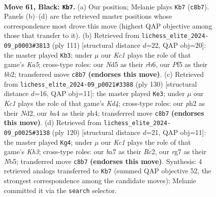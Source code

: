 \documentclass[11pt]{article}
\begin{document}
\clearpage

\begin{figure}[p]\centering
\begin{subfigure}{0.46\textwidth}\centering
\resizebox{\linewidth}{!}{%
\newchessgame
\chessboard[
  setfen={2k5/B1p3R1/8/3n1p2/B4P2/8/3K3P/8 b - - 4 61},
  showmover=false,
  pgfstyle=straightmove, color=movearrow, markmove={c8-b7}
]}
\caption{}
\end{subfigure}\hfill
\begin{subfigure}{0.46\textwidth}\centering
\resizebox{\linewidth}{!}{%
\newchessgame
\chessboard[
  setfen={4r3/8/1R4P1/8/kp6/8/1Bp5/6K1 b - - 1 56},
  showmover=false,
  pgfstyle=straightmove, color=movearrow, markmove={a4-b3}
]}
\caption{}
\end{subfigure}
\\[4pt]
\begin{subfigure}{0.46\textwidth}\centering
\resizebox{\linewidth}{!}{%
\newchessgame
\chessboard[
  setfen={5k2/1b6/8/5P2/3K3p/3p3P/3N1N1r/8 w - - 6 66},
  showmover=false,
  pgfstyle=straightmove, color=movearrow, markmove={d4-e3}
]}
\caption{}
\end{subfigure}\hfill
\begin{subfigure}{0.46\textwidth}\centering
\resizebox{\linewidth}{!}{%
\newchessgame
\chessboard[
  setfen={8/Pb1k4/1b3p1p/1N6/5p2/7K/2R2P2/8 w - - 0 61},
  showmover=false,
  pgfstyle=straightmove, color=movearrow, markmove={h3-g4}
]}
\caption{}
\end{subfigure}
\caption{\textbf{Move 61, Black: \texttt{Kb7}.} (a) Our position; Melanie plays \texttt{Kb7} (\texttt{c8b7}). Panels (b)--(d) are the retrieved master positions whose correspondence most drove this move (highest QAP objective among those that transfer to it). (b) Retrieved from \texttt{lichess\_elite\_2024-09\_p0003\#3813} (ply 111) [structural distance $d$=22, QAP obj=20]: the master played \texttt{Kb3}; under $\mu$ our \emph{Kc1} plays the role of that game's \emph{Ka5}; cross-type roles: our \emph{N}d5 as their \emph{r}b6, our \emph{P}f5 as their \emph{b}b2; transferred move \texttt{c8b7} \textbf{(endorses this move)}. (c) Retrieved from \texttt{lichess\_elite\_2024-09\_p0021\#3388} (ply 130) [structural distance $d$=16, QAP obj=11]: the master played \texttt{Ke3}; under $\mu$ our \emph{Kc1} plays the role of that game's \emph{Kd4}; cross-type roles: our \emph{p}h2 as their \emph{N}d2, our \emph{b}a4 as their \emph{p}h4; transferred move \texttt{c8b7} \textbf{(endorses this move)}. (d) Retrieved from \texttt{lichess\_elite\_2024-09\_p0025\#3138} (ply 120) [structural distance $d$=21, QAP obj=11]: the master played \texttt{Kg4}; under $\mu$ our \emph{Kc1} plays the role of that game's \emph{Kh3}; cross-type roles: our \emph{b}a7 as their \emph{R}c2, our \emph{r}g7 as their \emph{N}b5; transferred move \texttt{c8b7} \textbf{(endorses this move)}. Synthesis: 4 retrieved analogs transferred to \texttt{Kb7} (summed QAP objective 52, the strongest correspondence among the candidate moves); Melanie committed it via the \texttt{search} selector.}
\label{fig:thought-m121}
\end{figure}
\end{document}
